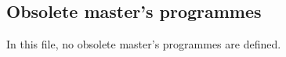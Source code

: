 \subsection{Obsolete master's programmes}\label{sec:obsoletemasters}
\ifobsoletemaster
  \def\ProvidesFile #1[#2]{}
  \let\kulemt@div@master\@gobble
  \renewcommand*\kulemt@def@master[2]{}
  \renewcommand*\kulemt@obsolete@master[3][]{%
    \printmasterinfo{#2\if &#1&\else .#1\fi}{#3}}
  
\else
  In this file, no obsolete master's programmes are defined.\par
\fi
\endgroup

